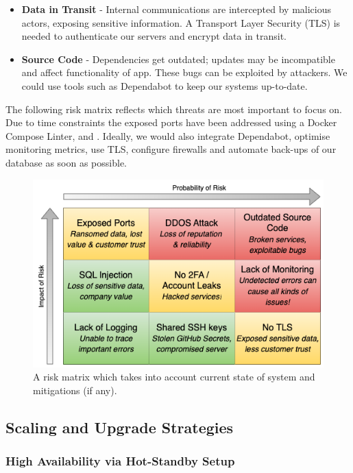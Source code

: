 \begin{itemize}
    \item \textbf{Data in Transit} - Internal communications are intercepted by malicious actors, exposing sensitive information. A Transport Layer Security (TLS) is needed to authenticate our servers and encrypt data in transit. 

    \item \textbf{Source Code} - Dependencies get outdated; updates may be incompatible and affect functionality of app. These bugs can be exploited by attackers. We could use tools such as Dependabot to keep our systems up-to-date.

\end{itemize}

The following risk matrix reflects which threats are most important to focus on. Due to time constraints the exposed ports have been addressed using a Docker Compose Linter, and . Ideally, we would also integrate Dependabot, optimise monitoring metrics, use TLS, configure firewalls and automate back-ups of our database as soon as possible.

\begin{figure} [!htb]
    \centering
    \includegraphics[width=0.7\linewidth]{Images/riskmatrix.png}
    \caption{A risk matrix which takes into account current state of system and mitigations (if any).}
    \label{fig:Seq}
\end{figure}


\subsection{Scaling and Upgrade Strategies}

\subsubsection{High Availability via Hot-Standby Setup}

